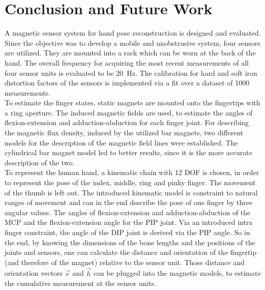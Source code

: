 
\lhead[\chaptername~\thechapter]{\rightmark}


\rhead[\leftmark]{}


\lfoot[\thepage]{}


\cfoot{}


\rfoot[]{\thepage}


\chapter{Conclusion and Future Work}

A magnetic sensor system for hand pose reconstruction is designed and evaluated. 
Since the objective was to develop a mobile and unobstrusive system, four sensors are utilized. They are mounted into a rack which can be worn at the back of the hand. The overall frequency for acquiring the most recent measurements of all four sensor units is evaluated to be \SI{20}{\Hz}. The calibration for hard and soft iron distortion factors of the sensors is implemented via a fit over a dataset of 1000 measurements.\\
To estimate the finger states, static magnets are mounted onto the fingertips with a ring aperture. The induced magnetic fields are used, to estimate the angles of flexion-extension and adduction-abduction for each finger joint. For describing the magnetic flux density, induced by the utilized bar magnets, two different models for the description of the magnetic field lines were established. The cylindrical bar magnet model led to better results, since it is the more accurate description of the two.\\
To represent the human hand, a kinematic chain with 12 \ac{DOF} is chosen, in order to represent the pose of the index, middle, ring and pinky finger. The movement of the thumb is left out. The introduced kinematic model is constraint to natural ranges of movement and can in the end describe the pose of one finger by three angular values. The angles of flexion-extension and adduction-abduction of the \ac{MCP} and the flexion-extension angle for the \ac{PIP} joint. Via an introduced intra finger constraint, the angle of the \ac{DIP} joint is derived via the \ac{PIP} angle. So in the end, by knowing the dimensions of the bone lengths and the positions of the joints and sensors, one can calculate the distance and orientation of the fingertip (and therefore of the magnet) relative to the sensor unit. Those distance and orientation vectors $ \vec{r} $ and $ \vec{h} $ can be plugged into the magnetic models, to estimate the cumulative measurement at the sensor units.\\
